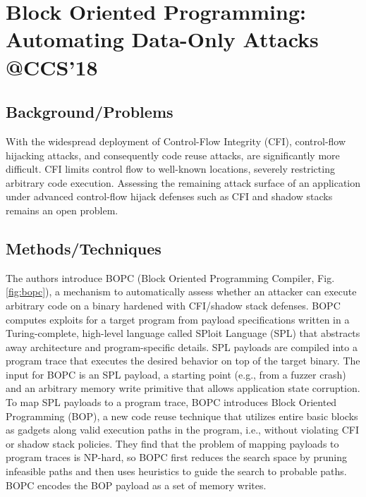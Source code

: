 \section{Block Oriented Programming: Automating Data-Only Attacks \\@CCS'18}
\subsection{Background/Problems}
With the widespread deployment of Control-Flow Integrity (CFI), control-flow hijacking attacks, and consequently code reuse attacks, are significantly more difficult. CFI limits control flow to well-known locations, severely restricting arbitrary code execution.  Assessing the remaining attack surface of an application under advanced control-flow hijack defenses such as CFI and shadow stacks remains an open problem.
\subsection{Methods/Techniques}
The authors introduce BOPC (Block Oriented Programming Compiler, Fig.\ref{fig:bopc}), a mechanism to automatically assess whether an attacker can execute arbitrary code on a binary hardened with CFI/shadow stack defenses. BOPC computes exploits for a target program from payload specifications written in a Turing-complete, high-level language called SPloit Language (SPL) that abstracts away architecture and program-specific details. SPL payloads are compiled into a program trace that executes the desired behavior on top of the target binary.  The input for BOPC is an SPL payload, a starting point (e.g., from a fuzzer crash) and an arbitrary memory write primitive that allows application state corruption. To map SPL payloads to a program trace, BOPC introduces Block Oriented Programming (BOP), a new code reuse technique that utilizes entire basic blocks as gadgets along valid execution paths in the program, i.e., without violating CFI or shadow stack policies. They find that the problem of mapping payloads to program traces is NP-hard, so BOPC first reduces the search space by pruning infeasible paths and then uses heuristics to guide the search to probable paths. BOPC encodes the BOP payload as a set of memory writes.

